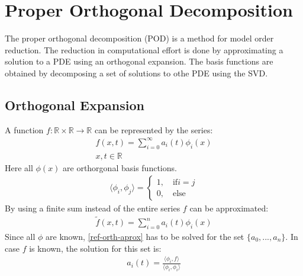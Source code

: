 \section{Proper Orthogonal Decomposition}
The proper orthogonal decomposition (POD) is a method for model order reduction.
The reduction in computational effort is done by approximating a solution to a PDE using an orthogonal expansion.
The basis functions are obtained by decomposing a set of solutions to othe PDE using the SVD.
\subsection{Orthogonal Expansion}
A function \(f: \mathbb{R} \times \mathbb{R} \rightarrow \mathbb{R}\) can be represented by the series:
\begin{gather}
f(x, t) = \sum_{i = 0}^{\infty}a_i(t)\phi_i(x) \\
x, t \in \mathbb{R} \label{ref-orth-exp}
\end{gather}
Here all \(\phi(x)\) are orthorgonal basis functions.
\begin{gather}
\langle\phi_i, \phi_j\rangle =\begin{cases}
1, \quad \text{if} i = j \\
0, \quad \text{else}
\end{cases} \label{phi-orth}
\end{gather}
By using a finite sum instead of the entire  series \(f\) can be approximated:
\begin{gather}
\tilde{f}(x, t) = \sum_{i = 0}^{n}a_{i}(t)\phi_{i}(x) \label{ref-orth-aprox}
\end{gather}
Since all \(\phi\) are known, \ref{ref-orth-aprox} has to be solved for the set \(\{a_0, ..., a_n\}\).
In case \(f\) is known, the solution for this set is:
\begin{gather}
a_i(t) = \frac{\langle \phi_i, f \rangle}{\langle \phi_i, \phi_i \rangle} \label{sol-ai}
\end{gather}
\cite{Gustafsson2011e}
